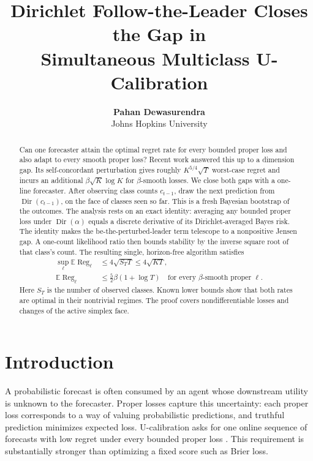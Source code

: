 \documentclass{article}
\title{Dirichlet Follow-the-Leader Closes the Gap in\\Simultaneous Multiclass U-Calibration}
\author{\textbf{Pahan Dewasurendra} \\ Johns Hopkins University}
\theoremstyle{definition}
\theoremstyle{remark}
\newcommand{\E}{\mathbb E}
\newcommand{\Dir}{\operatorname{Dir}}
\newcommand{\Reg}{\operatorname{Reg}}
\begin{document}
\maketitle

\begin{abstract}
Can one forecaster attain the optimal regret rate for every bounded proper loss and also adapt to every smooth proper loss?  Recent work answered this up to a dimension gap.  Its self-concordant perturbation gives roughly $K^{5/4}\sqrt T$ worst-case regret and incurs an additional $\beta\sqrt K\log K$ for $\beta$-smooth losses.  We close both gaps with a one-line forecaster.  After observing class counts $c_{t-1}$, draw the next prediction from $\Dir(c_{t-1})$, on the face of classes seen so far.  This is a fresh Bayesian bootstrap of the outcomes.  The analysis rests on an exact identity: averaging any bounded proper loss under $\Dir(\alpha)$ equals a discrete derivative of its Dirichlet-averaged Bayes risk.  The identity makes the be-the-perturbed-leader term telescope to a nonpositive Jensen gap.  A one-count likelihood ratio then bounds stability by the inverse square root of that class's count.  The resulting single, horizon-free algorithm satisfies
\begin{align*}
 \sup_{\ell}\E\Reg_\ell&\leq4\sqrt{S_TT}\leq4\sqrt{KT},\\
 \E\Reg_\ell&\leq\tfrac52\beta(1+\log T)
 \quad\text{for every $\beta$-smooth proper $\ell$.}
\end{align*}
Here $S_T$ is the number of observed classes.  Known lower bounds show that both rates are optimal in their nontrivial regimes.  The proof covers nondifferentiable losses and changes of the active simplex face.
\end{abstract}

\section{Introduction}

A probabilistic forecast is often consumed by an agent whose downstream utility is unknown to the forecaster.  Proper losses capture this uncertainty: each proper loss corresponds to a way of valuing probabilistic predictions, and truthful prediction minimizes expected loss.  U-calibration asks for one online sequence of forecasts with low regret under every bounded proper loss \citep{kleinberg2023ucal}.  This requirement is substantially stronger than optimizing a fixed score such as Brier loss.
\end{document}
